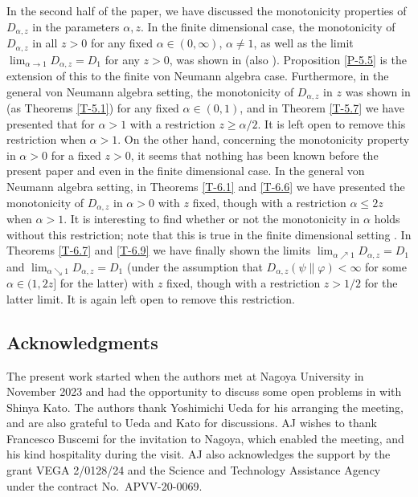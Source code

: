 \documentclass[12pt]{article}
\theoremstyle{definition}
\theoremstyle{remark}
\numberwithin{equation}{section}
\def\ffi{\varphi}
\begin{document}
In the second half of the paper, we have discussed the monotonicity properties of $D_{\alpha,z}$ in the
parameters $\alpha,z$. In the finite dimensional case, the monotonicity of $D_{\alpha,z}$ in all $z>0$ for
any fixed $\alpha\in(0,\infty)$, $\alpha\ne1$, as well as the limit $\lim_{\alpha\to1}D_{\alpha,z}=D_1$ for
any $z>0$, was shown in \cite{lin2015investigating} (also \cite{mosonyi2023somecontinuity}).
Proposition \ref{P-5.5} is the extension of this to the finite von Neumann algebra case. Furthermore,
in the general von Neumann algebra setting, the monotonicity of $D_{\alpha,z}$ in $z$ was shown in
\cite{kato2023onrenyi} (as Theorems \ref{T-5.1}) for any fixed $\alpha\in(0,1)$, and in Theorem \ref{T-5.7}
we have presented that for $\alpha>1$ with a restriction $z\ge\alpha/2$. It is left open to remove this
restriction when $\alpha>1$. On the other hand, concerning the monotonicity property in $\alpha>0$ for
a fixed $z>0$, it seems that nothing has been known before the present paper and
\cite{hiai2024log-majorization} even in the finite dimensional case. In the general von Neumann algebra
setting, in Theorems \ref{T-6.1} and \ref{T-6.6} we have presented the monotonicity of $D_{\alpha,z}$ in
$\alpha>0$ with $z$ fixed, though with a restriction $\alpha\le2z$ when $\alpha>1$. 
It is interesting to find whether or not the monotonicity in $\alpha$ holds without this restriction;
note that this is true in the finite dimensional setting \cite[Theorem
3.1(ii)]{hiai2024log-majorization}. In Theorems \ref{T-6.7} and
\ref{T-6.9} we have finally shown the limits $\lim_{\alpha\nearrow1}D_{\alpha,z}=D_1$ and
$\lim_{\alpha\searrow1}D_{\alpha,z}=D_1$ (under the assumption that $D_{\alpha,z}(\psi\|\ffi)<\infty$ for
some $\alpha\in(1,2z]$ for the latter) with $z$ fixed, though with a restriction $z>1/2$ for the latter limit.
It is again left open to remove this restriction.


\subsection*{Acknowledgments}

The present work started when the authors met at Nagoya University in November 2023 and had
the opportunity to discuss some open problems in \cite{kato2023onrenyi} with Shinya Kato. The authors
thank Yoshimichi Ueda for his arranging the meeting, and are also grateful to Ueda and Kato for discussions.
AJ wishes to thank Francesco Buscemi for the invitation to Nagoya, which enabled the
meeting,  and his kind hospitality during the visit. AJ also acknowledges the support by
the grant VEGA 2/0128/24 and the  Science and Technology Assistance Agency under the
contract No.\ APVV-20-0069.
\end{document}

